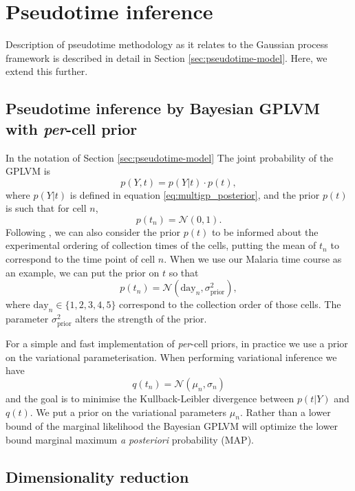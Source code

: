 \section{Pseudotime inference} \label{sec:m-pseudotime}

Description of pseudotime methodology as it relates to the Gaussian process framework is described in detail in Section \ref{sec:pseudotime-model}. Here, we extend this further.

\subsection{Pseudotime inference by Bayesian GPLVM with \textit{per}-cell prior}

In the notation of Section \ref{sec:pseudotime-model} The joint probability of the GPLVM is
\[ p(Y, t) = p(Y | t) \cdot p(t), \]
where $ p(Y | t) $ is defined in equation \ref{eq:multigp_posterior}, and the prior $ p(t) $ is such that for cell $ n $,
\[ p(t_n) = \mathcal{N}(0, 1). \]
Following \cite{Reid2016-ww}, we can also consider the prior $ p(t) $ to be informed about the experimental ordering of collection times of the cells, putting the mean of $ t_n $ to correspond to the time point of cell $ n $. When we use our Malaria time course as an example, we can put the prior on $ t $ so that
$$ p(t_n) = \mathcal{N}(\text{day}_n, \sigma_\text{prior}^2), $$
where $ \text{day}_n \in \{1, 2, 3, 4, 5 \} $ correspond to the collection order of those cells. The parameter $ \sigma_\text{prior}^2 $ alters the strength of the prior.

For a simple and fast implementation of \textit{per}-cell priors, in practice we use a prior on the variational parameterisation. When performing variational inference we have 
\[ q(t_n) = \mathcal{N}(\mu_n, \sigma_n) \]
and the goal is to minimise the Kullback-Leibler divergence between \( p(t | Y) \) and \( q(t) \). We put a prior on the variational parameters $ \mu_n $. Rather than a lower bound of the marginal likelihood the Bayesian GPLVM will optimize the lower bound marginal maximum \textit{a posteriori} probability (MAP).

\subsection{Dimensionality reduction}

